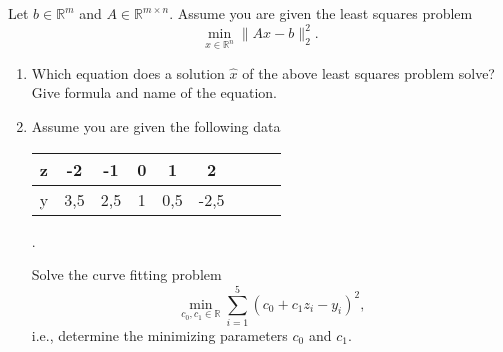 Let $b \in \mathbb{R}^m$ and $A \in \mathbb{R}^{m\times n}$.
Assume you are given the least squares problem 
$$
\min\limits_{x \in \mathbb{R}^n } \| Ax - b \|_2^2.
$$
\begin{enumerate}
	\item Which equation does a solution $\hat{x}$ of the above least squares problem solve? Give formula and name of the equation.
	\item Assume you are given the following data
	\begin{center}
	\begin{tabular}{|l|c|c|c|c|c|c||c|c|}\hline
		z&-2&-1&0&1&2\\ 
		\hline
		y&3,5&2,5&1&0,5&-2,5\\
		\hline
	\end{tabular}.
	\end{center}
	Solve the curve fitting problem
	$$
	\min\limits_{c_0,c_1 \in \mathbb{R}} \sum_{i=1}^5 (c_0 +c_1z_i - y_i)^2,
	$$
	i.e., determine the minimizing parameters $c_0$ and $c_1$.
\end{enumerate}

